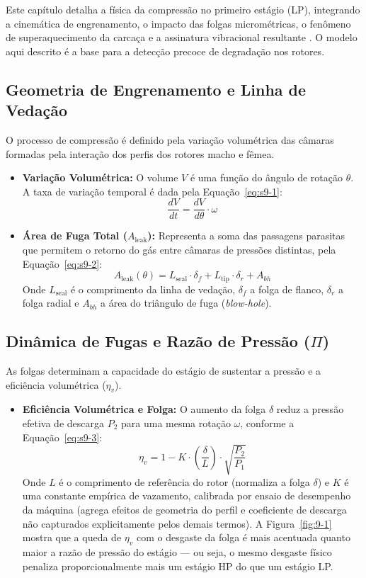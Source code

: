 \documentclass[12pt,a4paper]{article}
\numberwithin{equation}{section}
\numberwithin{table}{section}
\numberwithin{figure}{section}
\begin{document}
{	Este capítulo detalha a física da compressão no primeiro estágio (LP), integrando a cinemática de engrenamento, o impacto das folgas micrométricas, o fenômeno de superaquecimento da carcaça e a assinatura vibracional resultante \cite{bently}. O modelo aqui descrito é a base para a detecção precoce de degradação nos rotores.
	
	\subsection{\textbf{Geometria de Engrenamento e Linha de Vedação}}
	O processo de compressão é definido pela variação volumétrica das câmaras formadas pela interação dos perfis dos rotores macho e fêmea.
	\begin{itemize}
		\item \textbf{Variação Volumétrica:} O volume $V$ é uma função do ângulo de rotação $\theta$. A taxa de variação temporal é dada pela Equação~\eqref{eq:s9-1}:
		\begin{equation}\label{eq:s9-1}
 \frac{dV}{dt} = \frac{dV}{d\theta} \cdot \omega 
\end{equation}
		\item \textbf{Área de Fuga Total ($A_{\text{leak}}$):} Representa a soma das passagens parasitas que permitem o retorno do gás entre câmaras de pressões distintas, pela Equação~\eqref{eq:s9-2}:
		\begin{equation}\label{eq:s9-2}
 A_{\text{leak}}(\theta) = L_{\text{seal}} \cdot \delta_f + L_{\text{tip}} \cdot \delta_r + A_{bh} 
\end{equation}
		Onde $L_{\text{seal}}$ é o comprimento da linha de vedação, $\delta_f$ a folga de flanco, $\delta_r$ a folga radial e $A_{bh}$ a área do triângulo de fuga (\textit{blow-hole}).
	\end{itemize}
	
	\subsection{\textbf{Dinâmica de Fugas e Razão de Pressão (\texorpdfstring{$\Pi$}{Pi})}}
	As folgas determinam a capacidade do estágio de sustentar a pressão e a eficiência volumétrica ($\eta_v$).
	\begin{itemize}
		\item \textbf{Eficiência Volumétrica e Folga:} O aumento da folga $\delta$ reduz a pressão efetiva de descarga $P_2$ para uma mesma rotação $\omega$, conforme a Equação~\eqref{eq:s9-3}:
		\begin{equation}\label{eq:s9-3}
 \eta_v = 1 - K \cdot \left( \frac{\delta}{L} \right) \cdot \sqrt{\frac{P_2}{P_1}} 
\end{equation}
		Onde $L$ é o comprimento de referência do rotor (normaliza a folga $\delta$) e $K$ é uma constante empírica de vazamento, calibrada por ensaio de desempenho da máquina (agrega efeitos de geometria do perfil e coeficiente de descarga não capturados explicitamente pelos demais termos). A Figura~\ref{fig:9-1} mostra que a queda de $\eta_v$ com o desgaste da folga é mais acentuada quanto maior a razão de pressão do estágio — ou seja, o mesmo desgaste físico penaliza proporcionalmente mais um estágio HP do que um estágio LP.


\end{itemize}}
\end{document}
